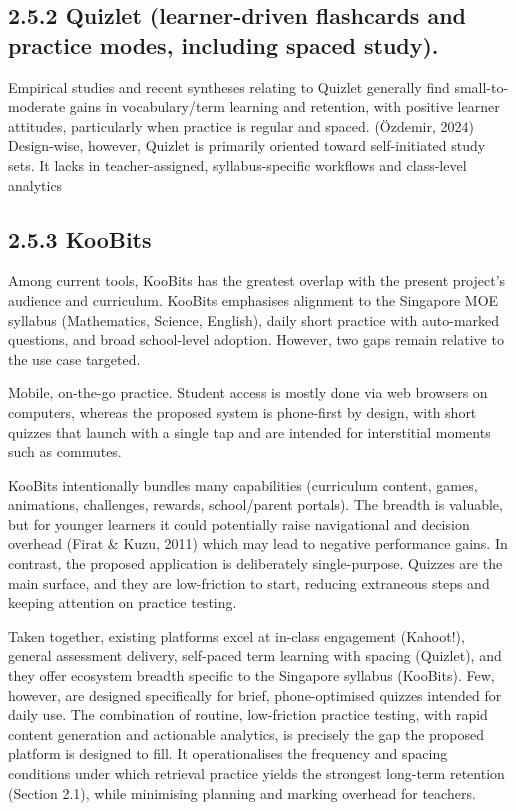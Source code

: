\documentclass[
  12pt,
  a4paper,
]{report}
\begin{document}
\hypertarget{quizlet-learner-driven-flashcards-and-practice-modes-including-spaced-study.}{%
\subsection{2.5.2 Quizlet (learner-driven flashcards and practice modes,
including spaced
study).}\label{quizlet-learner-driven-flashcards-and-practice-modes-including-spaced-study.}}

Empirical studies and recent syntheses relating to Quizlet generally
find small-to-moderate gains in vocabulary/term learning and retention,
with positive learner attitudes, particularly when practice is regular
and spaced. (Özdemir, 2024) Design-wise, however, Quizlet is primarily
oriented toward self-initiated study sets. It lacks in teacher-assigned,
syllabus-specific workflows and class-level analytics

\hypertarget{koobits}{%
\subsection{2.5.3 KooBits}\label{koobits}}

Among current tools, KooBits has the greatest overlap with the present
project's audience and curriculum. KooBits emphasises alignment to the
Singapore MOE syllabus (Mathematics, Science, English), daily short
practice with auto-marked questions, and broad school-level adoption.
However, two gaps remain relative to the use case targeted.

Mobile, on-the-go practice. Student access is mostly done via web
browsers on computers, whereas the proposed system is phone-first by
design, with short quizzes that launch with a single tap and are
intended for interstitial moments such as commutes.

KooBits intentionally bundles many capabilities (curriculum content,
games, animations, challenges, rewards, school/parent portals). The
breadth is valuable, but for younger learners it could potentially raise
navigational and decision overhead (Firat \& Kuzu, 2011) which may lead
to negative performance gains. In contrast, the proposed application is
deliberately single-purpose. Quizzes are the main surface, and they are
low-friction to start, reducing extraneous steps and keeping attention
on practice testing.

Taken together, existing platforms excel at in-class engagement
(Kahoot!), general assessment delivery, self-paced term learning with
spacing (Quizlet), and they offer ecosystem breadth specific to the
Singapore syllabus (KooBits). Few, however, are designed specifically
for brief, phone-optimised quizzes intended for daily use. The
combination of routine, low-friction practice testing, with rapid
content generation and actionable analytics, is precisely the gap the
proposed platform is designed to fill. It operationalises the frequency
and spacing conditions under which retrieval practice yields the
strongest long-term retention (Section 2.1), while minimising planning
and marking overhead for teachers.
\end{document}
